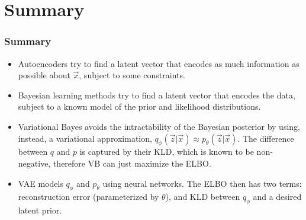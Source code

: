 \documentclass{beamer}
\begin{document}
\section{Summary}
\setcounter{subsection}{1}
    
\begin{frame}
  \frametitle{Summary}

  \begin{itemize}
  \item Autoencoders try to find a latent vector that encodes as much
    information as possible about $\vec{x}$, subject to some
    constraints.
  \item Bayesian learning methods try to find a latent vector that
    encodes the data, subject to a known model of the prior and
    likelihood distributions.
  \item Variational Bayes avoids the intractability of the Bayesian
    posterior by using, instead, a variational approximation,
    $q_\phi(\vec{z}|\vec{x})\approx p_\theta(\vec{z}|\vec{x})$.  The
    difference between $q$ and $p$ is captured by their KLD, which is
    known to be non-negative, therefore VB can just maximize the
    ELBO.
  \item VAE models $q_\phi$ and $p_\theta$ using neural networks.  The
    ELBO then has two terms: reconstruction error (parameterized by
    $\theta$), and KLD between $q_\phi$ and a desired latent prior.
  \end{itemize}
\end{frame}

        
\end{document}
